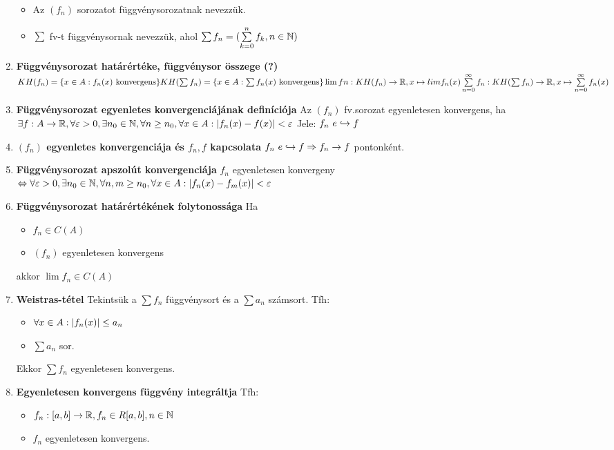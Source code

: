 \documentclass{article}
\begin{document}
\begin{enumerate}
	\begin{itemize}
		\item Az $(f_n)$ sorozatot függvénysorozatnak nevezzük.
		\item$\sum$ fv-t függvénysornak nevezzük, ahol $\sum f_n=
		(\sum\limits_{k=0}^n f_k, n\in\mathbb{N})$
	\end{itemize}
	\item\textbf{Függvénysorozat határértéke, függvénysor összege (?)}\br
	$KH(f_n)=\{x\in A:f_n(x)\text{ konvergens}\}\br
	KH(\sum f_n)=\{x\in A:\sum f_n(x)\text{ konvergens}\}\br
	\lim fn:KH(f_n)\rightarrow\R,x\mapsto lim f_n(x)\br
	\sum\limits_{n=0}^\infty f_n:KH(\sum f_n)\rightarrow\R,x\mapsto
	\sum\limits_{n=0}^\infty f_n(x)$
	\item\textbf{Függvénysorozat egyenletes konvergenciájának definíciója}\br
	Az $(f_n)$ fv.sorozat egyenletesen konvergens, ha\br$\exists f:A\rightarrow
	\mathbb{R},\forall\varepsilon>0,\exists n_0\in\mathbb{N},\forall n\geq n_0,\forall x\in A:
	\abs{f_n(x) - f(x)}< \varepsilon$\br
	Jele: $f_n \text{ }e\hookrightarrow f$
	\item\textbf{$(f_n)$ egyenletes konvergenciája és $f_n,f$ kapcsolata}\br
	$f_n\text{ }e\hookrightarrow f
	\Rightarrow f_n\rightarrow f$ pontonként.
	\item\textbf{Függvénysorozat apszolút konvergenciája}\br
	$f_n$ egyenletesen konvergeny $\Leftrightarrow\forall\varepsilon>0,
	\exists n_0\in\mathbb{N},\forall n,m\geq n_0,\forall x\in A:\abs{f_n(x) - f_m(x)}< \varepsilon$
	\item\textbf{Függvénysorozat határértékének folytonossága}\br
	Ha \begin{itemize}
		\item $f_n\in C(A)$
		\item $(f_n)$ egyenletesen konvergens
	\end{itemize}
	akkor $\lim f_n\in C(A)$
	\item\textbf{Weistras-tétel}\br
	Tekintsük a $\sum f_n$ függvénysort és a $\sum a_n$ számsort. Tfh:
	\begin{itemize}
		\item $\forall x\in A:\abs{f_n(x)}\leq a_n$
		\item $\sum a_n$ sor.
	\end{itemize}
	Ekkor $\sum f_n$ egyenletesen konvergens.
	\item\textbf{Egyenletesen konvergens függvény integráltja}\br
	Tfh: \begin{itemize}
		\item $f_n:[a,b]\rightarrow\mathbb{R},f_n\in R[a,b],n\in\mathbb{N}$
		\item $f_n$ egyenletesen konvergens.

\end{itemize}
\end{enumerate}
\end{document}
